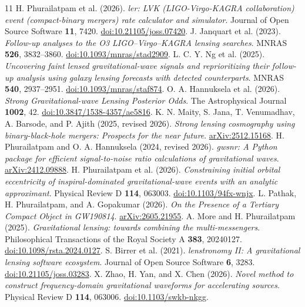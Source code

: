 \documentclass[11pt]{article}
\begin{document}
\newpage
\renewcommand{\refname}{References}
\begin{thebibliography}{11}
\setlength{\itemsep}{8pt}
 H. Phurailatpam et al. (2026).
\textit{ler: LVK (LIGO-Virgo-KAGRA collaboration) event (compact-binary mergers) rate calculator and simulator}.
Journal of Open Source Software \textbf{11}, 7420.
\href{https://doi.org/10.21105/joss.07420}{doi:10.21105/joss.07420}.
 J. Janquart et al. (2023).
\textit{Follow-up analyses to the O3 LIGO--Virgo--KAGRA lensing searches}.
MNRAS \textbf{526}, 3832--3860.
\href{https://doi.org/10.1093/mnras/stad2909}{doi:10.1093/mnras/stad2909}.
 L. C. Y. Ng et al. (2025).
\textit{Uncovering faint lensed gravitational-wave signals and reprioritizing their follow-up analysis using galaxy lensing forecasts with detected counterparts}.
MNRAS \textbf{540}, 2937--2951.
\href{https://doi.org/10.1093/mnras/staf874}{doi:10.1093/mnras/staf874}.
 O. A. Hannuksela et al. (2026).
\textit{Strong Gravitational-wave Lensing Posterior Odds}.
The Astrophysical Journal \textbf{1002}, 42.
\href{https://doi.org/10.3847/1538-4357/ae5816}{doi:10.3847/1538-4357/ae5816}.
 K. N. Maity, S. Jana, T. Venumadhav, A. Barsode, and P. Ajith (2025, revised 2026).
\textit{Strong lensing cosmography using binary-black-hole mergers: Prospects for the near future}.
\href{https://arxiv.org/abs/2512.15168}{arXiv:2512.15168}.
 H. Phurailatpam and O. A. Hannuksela (2024, revised 2026).
\textit{gwsnr: A Python package for efficient signal-to-noise ratio calculations of gravitational waves}.
\href{https://arxiv.org/abs/2412.09888}{arXiv:2412.09888}.
 H. Phurailatpam et al. (2026).
\textit{Constraining initial orbital eccentricity of inspiral-dominated gravitational-wave events with an analytic approximant}.
Physical Review D \textbf{114}, 063003.
\href{https://doi.org/10.1103/94fx-wnjx}{doi:10.1103/94fx-wnjx}.
 L. Pathak, H. Phurailatpam, and A. Gopakumar (2026).
\textit{On the Presence of a Tertiary Compact Object in GW190814}.
\href{https://arxiv.org/abs/2605.21955}{arXiv:2605.21955}.
 A. More and H. Phurailatpam (2025).
\textit{Gravitational lensing: towards combining the multi-messengers}.
Philosophical Transactions of the Royal Society A \textbf{383}, 20240127.
\href{https://doi.org/10.1098/rsta.2024.0127}{doi:10.1098/rsta.2024.0127}.
 S. Birrer et al. (2021).
\textit{lenstronomy II: A gravitational lensing software ecosystem}.
Journal of Open Source Software \textbf{6}, 3283.
\href{https://doi.org/10.21105/joss.03283}{doi:10.21105/joss.03283}.
 X. Zhao, H. Yan, and X. Chen (2026).
\textit{Novel method to construct frequency-domain gravitational waveforms for accelerating sources}.
Physical Review D \textbf{114}, 063006.
\href{https://doi.org/10.1103/swkb-nkgg}{doi:10.1103/swkb-nkgg}.
\end{thebibliography}
\end{document}
